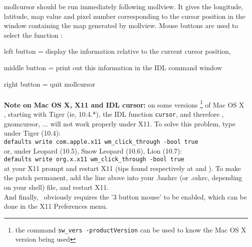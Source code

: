 \begin{codedescription}
{mollcursor should be run immediately following mollview. It gives the
longitude, latitude, map value and pixel number
corresponding to the cursor position in the window containing the map generated
by mollview. Mouse buttons are used to select the function :  

left button = display the information relative to the current cursor position, 

middle button = print out this information in the IDL command window 

right button = quit mollcursor\\
\\
{\bf{Note on Mac OS X, X11 and IDL cursor:}} on some versions%
\footnote{the command {\tt sw\_vers -productVersion}
 can be used to know the Mac OS X version being used}%
of Mac OS X
, starting with Tiger (ie,
10.4.*), the IDL function {\tt cursor}, and therefore \healpix \thedocid,
gnomcursor, $\ldots$ will not
work properly under X11. To solve this problem, type \\
under Tiger (10.4): \\
{\small {\tt defaults write com.apple.x11 wm\_click\_through -bool true}} \\
or, under Leopard (10.5), Snow Leopard (10.6), Lion (10.7): \\
{\small {\tt defaults write org.x.x11 wm\_click\_through -bool true}} \\
at your X11 prompt and restart X11 (tips found respectively at
and 
). 
To make the patch permanent, add the line above into your .bashrc (or
.cshrc, depending on your shell) file, and restart X11.\\
And finally, \thedocid\ obviously requires the '3 button mouse' to be enabled,
which can be done in the X11 Preferences menu.
}
\end{codedescription}




